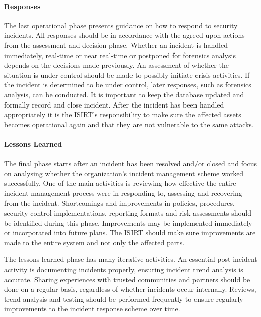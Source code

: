 \paragraph{Responses} The last operational phase presents guidance on how to respond to security incidents. All responses should be in accordance with the agreed upon actions from the assessment and decision phase. Whether an incident is handled immediately, real-time or near real-time or postponed for forensics analysis depends on the decisions made previously. An assessment of whether the situation is under control should be made to possibly initiate crisis activities. If the incident is determined to be under control, later responses, such as forensics analysis, can be conducted. It is important to keep the database updated and formally record and close incident. After the incident has been handled appropriately it is the ISIRT's responsibility to make sure the affected assets becomes operational again and that they are not vulnerable to the same attacks. 


\paragraph{Lessons Learned} The final phase starts after an incident has been resolved and/or closed and focus on analysing whether the organization's incident management scheme worked successfully. One of the main activities is reviewing how effective the entire incident management process were in responding to, assessing and recovering from the incident. Shortcomings and improvements in policies, procedures, security control implementations, reporting formats and risk assessments should be identified during this phase. Improvements may be implemented immediately or incorporated into future plans. The ISIRT should make sure improvements are made to the entire system and not only the affected parts.

The lessons learned phase has many iterative activities. An essential post-incident activity is documenting incidents properly, ensuring incident trend analysis is accurate. Sharing experiences with trusted communities and partners should be done on a regular basis, regardless of whether incidents occur internally. Reviews, trend analysis and testing should be performed frequently to ensure regularly improvements to the incident response scheme over time. 




